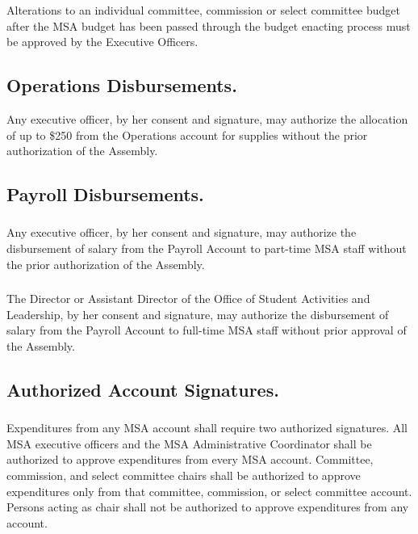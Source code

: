 \subsubsection{}
Alterations to an individual committee, commission or select committee budget after the MSA budget has been passed through the budget enacting process must be approved by the Executive Officers.

\subsection{Operations Disbursements.}
Any executive officer, by her consent and signature, may authorize the allocation of up to \$250 from the Operations account for supplies without the prior authorization of the Assembly.

\subsection{Payroll Disbursements.}
\subsubsection{}
Any executive officer, by her consent and signature, may authorize the disbursement of salary from the Payroll Account to part-time MSA staff without the prior authorization of the Assembly.  
\subsubsection{}
The Director or Assistant Director of the Office of Student Activities and Leadership, by her consent and signature, may authorize the disbursement of salary from the Payroll Account to full-time MSA staff without prior approval of the Assembly.

\subsection{Authorized Account Signatures.}
\subsubsection{}
Expenditures from any MSA account shall require two authorized signatures.  All MSA executive officers and the MSA Administrative Coordinator shall be authorized to approve expenditures from every MSA account.  Committee, commission, and select committee chairs shall be authorized to approve expenditures only from that committee, commission, or select committee account.  Persons acting as chair shall not be authorized to approve expenditures from any account.  
